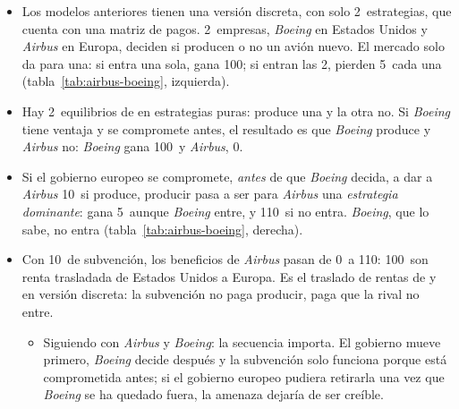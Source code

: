 \documentclass[11pt]{article}
\begin{document}
\begin{itemize}
\item Los modelos anteriores tienen una versión discreta, con solo 2~estrategias, que \textcite[136]{Krugman1987Passe} cuenta con una matriz de pagos. 2~empresas, \emph{Boeing} en Estados Unidos y \emph{Airbus} en Europa, deciden si producen o no un avión nuevo. El mercado solo da para una: si entra una sola, gana 100; si entran las 2, pierden 5~cada una (tabla~\ref{tab:airbus-boeing}, izquierda).
\item Hay 2~equilibrios de  en estrategias puras: produce una y la otra no. Si \emph{Boeing} tiene ventaja y se compromete antes, el resultado es que \emph{Boeing} produce y \emph{Airbus} no: \emph{Boeing} gana 100~y \emph{Airbus}, 0.
\item Si el gobierno europeo se compromete, \emph{antes} de que \emph{Boeing} decida, a dar a \emph{Airbus} 10~si produce, producir pasa a ser para \emph{Airbus} una \emph{estrategia dominante}: gana 5~aunque \emph{Boeing} entre, y 110~si no entra. \emph{Boeing}, que lo sabe, no entra (tabla~\ref{tab:airbus-boeing}, derecha).
\item Con 10~de subvención, los beneficios de \emph{Airbus} pasan de 0~a 110: 100~son renta trasladada de Estados Unidos a Europa. Es el traslado de rentas de  y  en versión discreta: la subvención no paga producir, paga que la rival no entre.
  \begin{itemize}
  \item Siguiendo con \emph{Airbus} y \emph{Boeing}: la secuencia importa. El gobierno mueve primero, \emph{Boeing} decide después y la subvención solo funciona porque está comprometida antes; si el gobierno europeo pudiera retirarla una vez que \emph{Boeing} se ha quedado fuera, la amenaza dejaría de ser creíble.
  \end{itemize}
\end{itemize}
\end{document}
